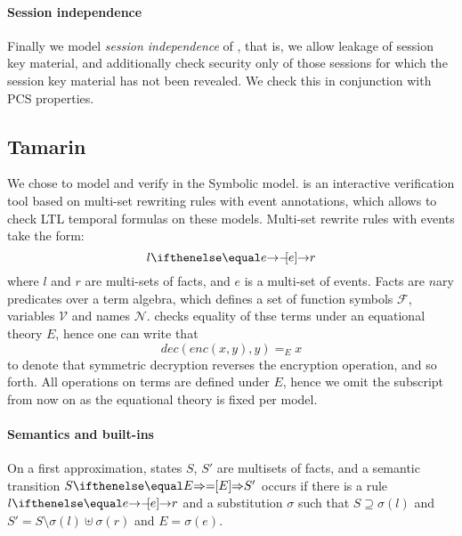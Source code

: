 \paragraph{Session independence}
Finally we model \emph{session independence} of \mEdhoc, that is, we allow
leakage of session key material, and additionally check security only of those
sessions for which the session key material has not been revealed. We check this
in conjunction with PCS properties.


\subsection{Tamarin}
We chose \mTamarin{} to model and verify \mEdhoc{} in the Symbolic model.
%
\mTamarin{} is an interactive verification tool based on multi-set rewriting rules
with event annotations, which allows to check LTL temporal formulas on these
models.
%
Multi-set rewrite rules with events take the form:
%
\[ l \ifarrow[e] r \]
%
where $l$ and $r$ are multi-sets of facts, and $e$ is a multi-set of events.
%
Facts are $n$ary predicates over a term algebra, which defines a set of function
symbols $\mathcal F$, variables $\mathcal V$ and names $\mathcal N$. \mTamarin{}
checks equality of thse terms under an equational theory $E$, hence one can
write that
%
\[ dec(enc(x,y),y) =_E x \]
%
to denote that symmetric decryption reverses the encryption operation, and so
forth. All operations on terms are defined under $E$, hence we omit the
subscript from now on as the equational theory is fixed per model.

\paragraph{Semantics and built-ins} On a first approximation, \mTamarin{} states
$S$, $S'$ are multisets of facts, and a semantic transition $S \semarrow[E] S'$
occurs if there is a rule $l \ifarrow[e] r$ and a substitution $\sigma$ such
that $S \supseteq \sigma(l)$ and $S' = S \setminus \sigma(l) \uplus \sigma(r)$
and $E = \sigma(e)$.

